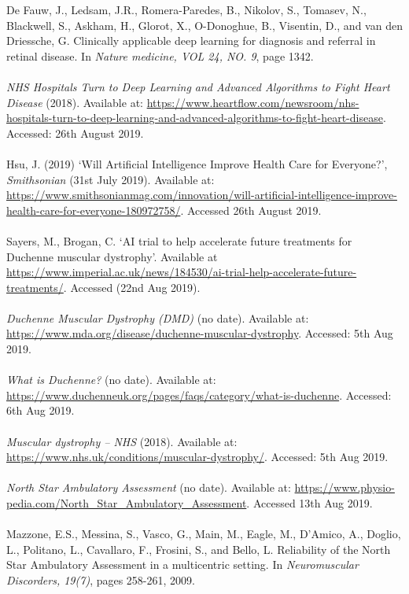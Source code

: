 \documentclass[12pt,twoside]{report}
\begin{document}
\quad [1] De Fauw, J., Ledsam, J.R., Romera-Paredes, B., Nikolov, S., Tomasev, N., Blackwell, S., Askham, H., Glorot, X., O-Donoghue, B., Visentin, D., and van den Driessche, G. Clinically applicable deep learning for diagnosis and referral in retinal disease. In \textit{Nature medicine, VOL 24, NO. 9}, page 1342.\\ \\
\quad [2] \textit{NHS Hospitals Turn to Deep Learning and Advanced Algorithms to Fight Heart Disease} (2018). Available at: \url{https://www.heartflow.com/newsroom/nhs-hospitals-turn-to-deep-learning-and-advanced-algorithms-to-fight-heart-disease}. Accessed: 26th August 2019.\\ \\
\quad [3] Hsu, J. (2019) ‘Will Artificial Intelligence Improve Health Care for Everyone?’, \textit{Smithsonian} (31st July 2019). Available at: \url{https://www.smithsonianmag.com/innovation/will-artificial-intelligence-improve-health-care-for-everyone-180972758/}. Accessed 26th August 2019.\\ \\
\quad [4] Sayers, M., Brogan, C. ‘AI trial to help accelerate future treatments for Duchenne muscular dystrophy’. Available at \url{https://www.imperial.ac.uk/news/184530/ai-trial-help-accelerate-future-treatments/}. Accessed (22nd Aug 2019).\\ \\
\quad [5] \textit{Duchenne Muscular Dystrophy (DMD)} (no date). Available at: \url{https://www.mda.org/disease/duchenne-muscular-dystrophy}. Accessed: 5th Aug 2019.\\ \\
\quad [6] \textit{What is Duchenne?} (no date). Available at: \url{https://www.duchenneuk.org/pages/faqs/category/what-is-duchenne}. Accessed: 6th Aug 2019.\\ \\
\quad [7] \textit{Muscular dystrophy – NHS} (2018). Available at: \url{https://www.nhs.uk/conditions/muscular-dystrophy/}. Accessed: 5th Aug 2019.\\ \\
\quad [8] \textit{North Star Ambulatory Assessment} (no date). Available at: \url{https://www.physio-pedia.com/North\_Star\_Ambulatory\_Assessment}. Accessed 13th Aug 2019.\\ \\
\quad [9] Mazzone, E.S., Messina, S., Vasco, G., Main, M., Eagle, M., D’Amico, A., Doglio, L., Politano, L., Cavallaro, F., Frosini, S., and Bello, L. Reliability of the North Star Ambulatory Assessment in a multicentric setting. In \textit{Neuromuscular Discorders, 19(7)}, pages 258-261, 2009.\\ \\
\end{document}
